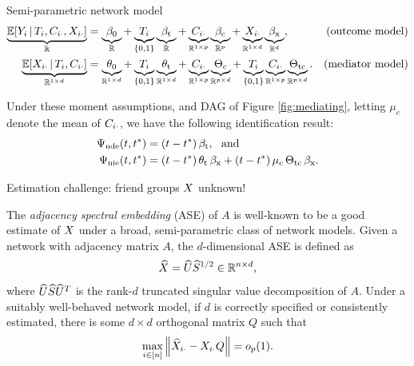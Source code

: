 \documentclass[final]{beamer}
\newlength{\colwidth}
\begin{document}
\begin{frame}[t]
\begin{columns}[t]
\begin{column}{\colwidth}
\begin{block}{Semi-parametric network model}
        \begin{equation*}
          \begin{aligned}
            \underbrace{\E[T_i, \C_{i \cdot}, \X_{i \cdot}]{Y_i}}_{\R}
             & = \underbrace{\betazero}_{\R}
            + \underbrace{T_i}_{\{0, 1\}} \underbrace{\betat}_{\R}
            + \underbrace{\C_{i \cdot}}_{\R^{1 \times p}} \underbrace{\betac}_{\R^{p}}
            + \underbrace{\X_{i \cdot}}_{\R^{1 \times d}} \underbrace{\betax}_{\R^d},
             & \text{(outcome model)}                      \\
            \underbrace{\E[T_i, \C_{i \cdot}]{\X_{i \cdot}}}_{\R^{1 \times d}}
             & = \underbrace{\thetazero}_{\R^{1 \times d}}
            + \underbrace{T_i}_{\{0, 1\}} \underbrace{\thetat}_{\R^{1 \times d}}
            + \underbrace{\C_{i \cdot}}_{\R^{1 \times p}} \underbrace{\Thetac}_{\R^{p \times d}}
            + \underbrace{T_i}_{\{0, 1\}} \underbrace{\C_{i \cdot}}_{\R^{1 \times p}} \underbrace{\Thetatc}_{\R^{p \times d}}.
             & \text{(mediator model)}
          \end{aligned}
        \end{equation*}

        Under these moment assumptions, and DAG of Figure \ref{fig:mediating}, letting $\mu_c$ denote the mean of $C_{i \cdot}$, we have the following identification result:
        \begin{align*}
          \ndef & = \paren*{t - t^*} \, \betat, ~ \text{ and }                                        \\
          \nief & = \paren*{t - t^*} \, \thetat \, \betax + (t - t^*) \, \mu_c \, \Thetatc \, \betax.
        \end{align*}
      \end{block}

      \begin{block}{Estimation challenge: friend groups $X$ unknown!}

        The \emph{adjacency spectral embedding} (ASE) of $A$ is well-known to be a good estimate of $X$ under a broad, semi-parametric class of network models. Given a network with adjacency matrix $A$, the $d$-dimensional ASE is defined as
        \begin{equation*}
          \widehat{X} = \widehat{U} \widehat{S}^{1/2} \in \mathbb{R}^{n \times d},
        \end{equation*}
        where $\widehat{U} \widehat{S} \widehat{U}^T$ is the rank-$d$ truncated singular value decomposition of $A$. Under a suitably well-behaved network model, if $d$ is correctly specified or consistently estimated, there is some $d \times d$ orthogonal matrix $Q$ such that
        \begin{equation*}
          \max_{i \in [n]} \, \norm*{\Xhat_{i \cdot} - \X_{i \cdot} Q} = \op{1}.
        \end{equation*}
      \end{block}



\end{column}
\end{columns}
\end{frame}
\end{document}

